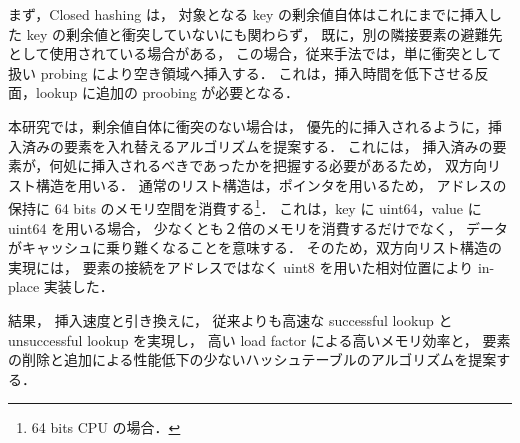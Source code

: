 まず，Closed hashing は，
対象となる key の剰余値自体はこれにまでに挿入した key の剰余値と衝突していないにも関わらず，
既に，別の隣接要素の避難先として使用されている場合がある，
この場合，従来手法では，単に衝突として扱い probing により空き領域へ挿入する．
これは，挿入時間を低下させる反面，lookup に追加の proobing が必要となる．

本研究では，剰余値自体に衝突のない場合は，
優先的に挿入されるように，挿入済みの要素を入れ替えるアルゴリズムを提案する．
これには，
挿入済みの要素が，何処に挿入されるべきであったかを把握する必要があるため，
双方向リスト構造を用いる．
通常のリスト構造は，ポインタを用いるため，
アドレスの保持に 64 bits のメモリ空間を消費する\footnote{64 bits CPU の場合．}．
これは，key に uint64，value に uint64 を用いる場合，
少なくとも２倍のメモリを消費するだけでなく，
データがキャッシュに乗り難くなることを意味する．
そのため，双方向リスト構造の実現には，
要素の接続をアドレスではなく uint8 を用いた相対位置により in-place 実装した．

結果，
挿入速度と引き換えに，
従来よりも高速な successful lookup と unsuccessful lookup を実現し，
高い load factor による高いメモリ効率と，
要素の削除と追加による性能低下の少ないハッシュテーブルのアルゴリズムを提案する．






